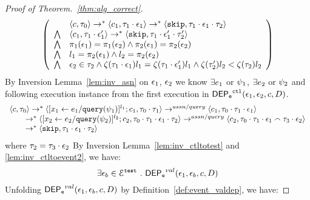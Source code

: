 \begin{proof}[Proof of Theorem.~\ref{thm:alg_correct}]
\[\left(
\begin{array}{ll}   
  & \config{{c}, \vtrace_0} \rightarrow^{*} 
    \config{{c}_1, \vtrace_1 \cdot \event_1}  \rightarrow^{*} 
    \config{\eskip,  \vtrace_1 \cdot \event_1 \cdot \vtrace_2} 
  \\ 
  \bigwedge &
  \config{{c}_1, \vtrace_1 \cdot \event_1'}  \rightarrow^{*} 
  \config{\eskip,  \vtrace_1 \cdot \event_1' \cdot \vtrace_2' } 
  \\
  \bigwedge &  \pi_1(\event_1) = \pi_1(\event_2) \land \pi_2(\event_1) = \pi_2(\event_2) \\
  \bigwedge & l_1 = \pi_2(\event_1) \land l_2 = \pi_2(\event_2)
  \\
  \bigwedge & \event_2 \in \trace_2 \land \vcounter(\vtrace_1 \cdot \event_1) l_1 = \vcounter(\vtrace_1 \cdot \event_1')l_1  \land \vcounter(\vtrace_2') l_2 < \vcounter(\trace_2) l_2 
\end{array}
\right)
 \]%
By Inversion Lemma~\ref{lem:inv_asn} on 
 $\mathtt{\epsilon}_1$, $\mathtt{\epsilon}_2$ we know $\exists e_1$ or $\psi_1$, $\exists e_2$ or $\psi_2$ and following execution instance
  from the first execution in $\mathsf{DEP_{\mathtt{e}}}^{\mathtt{{ctl}}}(\mathtt{\epsilon}_1, \mathtt{\epsilon}_2, c, D)$.
\begin{equation}
  \begin{array}{l}   
\langle {c}, \mathtt{\tau}_0 \rangle \rightarrow^{*} 
\langle [\mathrel{ {x}_1 \leftarrow e_1 / {\tt query}(\psi_1) }]^{l_1} ; {c}_1, \mathtt{\tau}_0 \cdot \mathtt{\tau}_1 \rangle  
\rightarrow^{assn/query}
 \langle c_1, \mathtt{\tau}_0 \cdot \mathtt{\tau}_1 \cdot \mathtt{\epsilon}_1 \rangle 
 \\ \qquad 
 \rightarrow^{*} 
  \langle [\mathrel{ {x}_2 \leftarrow e_2 / {\tt query}(\psi_2) }]^{l_2};{c}_2, 
  \mathtt{\tau}_0 \cdot \mathtt{\tau}_1 \cdot \mathtt{\epsilon}_1 \cdot \mathtt{\tau}_2 \rangle 
  \rightarrow^{assn/query} 
  \langle {c}_2,  \mathtt{\tau}_0 \cdot \mathtt{\tau}_1 \cdot \mathtt{\epsilon}_1 \smallfrown \mathtt{\tau}_3 \cdot \mathtt{\epsilon}_2 \rangle 
  \\ \qquad 
  \rightarrow^*
  \langle \mathtt{skip},  \mathtt{\tau}_1 \cdot \mathtt{\epsilon}_1 \cdot \mathtt{\tau}_2 \rangle
\end{array}
\end{equation}
%
where $\mathtt{\tau}_2 = \mathtt{\tau}_3 \cdot \mathtt{\epsilon}_2 $
%
 By {Inversion Lemma~\ref{lem:inv_ctltotest} and \ref{lem:inv_ctltoevent2}}, we have:
 \[
   \exists \mathtt{\epsilon}_b \in \mathcal{E}^{\mathtt{{test}}} ~.~ \mathsf{DEP_{\mathtt{e}}}^{val}(\mathtt{\epsilon}_1, \mathtt{\epsilon}_b, c, D)
 \]
 Unfolding $\mathsf{DEP_{\mathtt{e}}}^{val}(\mathtt{\epsilon}_1, \mathtt{\epsilon}_b, c, D)$ by Definition~\ref{def:event_valdep}, we have:

\end{proof}
